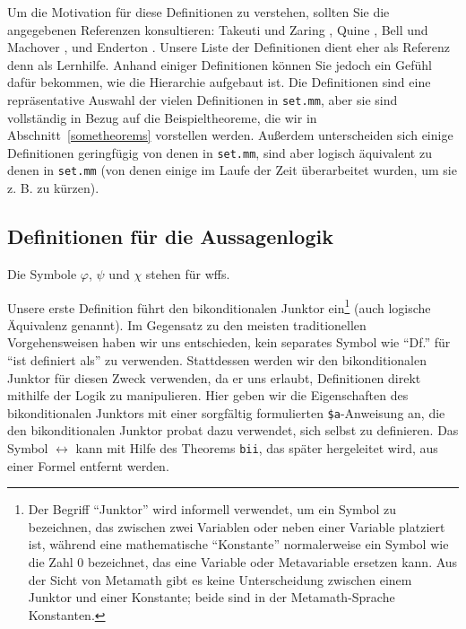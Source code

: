 Um die Motivation für diese Definitionen zu verstehen, sollten Sie die angegebenen Referenzen konsultieren:  Takeuti und Zaring \cite{Takeuti}, Quine \cite{Quine}, Bell und Machover \cite{Bell}, und Enderton \cite{Enderton}.  Unsere Liste der Definitionen dient eher als Referenz denn als Lernhilfe.  Anhand einiger Definitionen können Sie jedoch ein Gefühl dafür bekommen, wie die Hierarchie aufgebaut ist.  Die Definitionen sind eine repräsentative Auswahl der vielen Definitionen in \texttt{set.mm}, aber sie sind vollständig in Bezug auf die Beispieltheoreme, die wir in Abschnitt~\ref{sometheorems} vorstellen werden.  Außerdem unterscheiden sich einige Definitionen geringfügig von denen in \texttt{set.mm}, sind aber logisch äquivalent zu denen in \texttt{set.mm} (von denen einige im Laufe der Zeit überarbeitet wurden, um sie z. B. zu kürzen).

\subsection{Definitionen für die Aussagenlogik}\label{metadefprop}

Die Symbole $\varphi$, $\psi$ und $\chi$ stehen für wffs.

Unsere erste Definition führt den bikonditionalen Junktor ein\footnote{Der Begriff "`Junktor"' wird informell verwendet, um ein Symbol zu bezeichnen, das zwischen zwei Variablen oder neben einer Variable platziert ist, während eine mathematische "`Konstante"' normalerweise ein Symbol wie die Zahl 0 bezeichnet, das eine Variable oder Metavariable ersetzen kann.  Aus der Sicht von Metamath gibt es keine Unterscheidung zwischen einem Junktor und einer Konstante; beide sind in der Metamath-Sprache Konstanten.} (auch logische Äquivalenz genannt).  Im Gegensatz zu den meisten traditionellen Vorgehensweisen haben wir uns entschieden, kein separates Symbol wie "`Df."' für "`ist definiert als"' zu verwenden.  Stattdessen werden wir den bikonditionalen Junktor für diesen Zweck verwenden, da er uns erlaubt, Definitionen direkt mithilfe der Logik zu manipulieren.  Hier geben wir die Eigenschaften des bikonditionalen Junktors mit einer sorgfältig formulierten \texttt{\$a}-Anweisung an, die den bikonditionalen Junktor probat dazu verwendet, sich selbst zu definieren.  Das Symbol $\leftrightarrow$ kann mit Hilfe des Theorems \texttt{bii}, das später hergeleitet wird, aus einer Formel entfernt werden.

